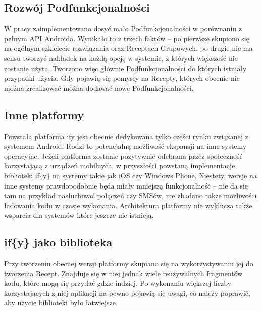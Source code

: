 \documentclass[11pt,a4paper,polish,thesis]{dcsbook}
\begin{document}
\subsection{Rozwój Podfunkcjonalności}
W pracy zaimplementowano dosyć mało Podfunkcjonalności w porównaniu z pełnym API Androida. Wynikało to z trzech faktów -- po pierwsze skupiono się na ogólnym szkielecie rozwiązania oraz Receptach Grupowych, po drugie nie ma sensu tworzyć nakładek na każdą opcję w systemie, z których większość nie zostanie użyta. Tworzono więc głównie Podfunkcjonalności do których istniały przypadki użycia. Gdy pojawią się pomysły na Recepty, których obecnie nie można zrealizować można dodawać nowe Podfunkcjonalności. 
\subsection{Inne platformy}
Powstała platforma if{y} jest obecnie dedykowana tylko części rynku związanej z systemem Android. Rodzi to potencjalną możliwość ekspansji na inne systemy operacyjne. 
Jeżeli platforma zostanie pozytywnie odebrana przez społeczność korzystającą z urządzeń mobilnych, w przyszłości powstaną implementacje biblioteki if\{y\} na systemy
takie jak iOS czy Windows Phone. Niestety, wersje na inne systemy prawdopodobnie będą miały mniejszą funkcjonalność -- nie da się tam na przykład nasłuchiwać połączeń czy SMSów, nie zbadano także możliwości ładowania kodu w czasie wykonania. Architektura platformy nie wyklucza także wsparcia dla systemów które jeszcze nie istnieją.
\subsection{if\{y\} jako biblioteka}
Przy tworzeniu obecnej wersji platformy skupiano się na wykorzystywaniu jej do tworzenia Recept. Znajduje się w niej jednak wiele reużywalnych fragmentów kodu, które mogą się przydać gdzie indziej. Po wykonaniu większej liczby korzystających z niej aplikacji na pewno pojawią się uwagi, co należy poprawić, aby użycie biblioteki było łatwiejsze.

\appendix 
\end{document}
